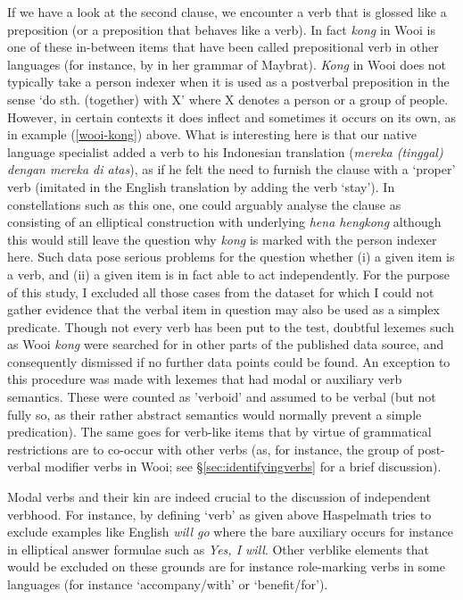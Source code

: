 If we have a look at the second clause, we encounter a verb that is glossed like a preposition (or a preposition that behaves like a verb). In fact \textit{kong} in Wooi is one of these in-between items that have been called prepositional verb in other languages (for instance, by \citet{dol2007grammar} in her grammar of Maybrat). \textit{Kong} in Wooi does not typically take a person indexer when it is used as a postverbal preposition in the sense `do sth. (together) with X' where X denotes a person or a group of people. However, in certain contexts it does inflect and sometimes it occurs on its own, as in example (\ref{wooi-kong}) above. What is interesting here is that our native language specialist added a verb to his Indonesian translation (\textit{mereka (tinggal) dengan mereka di atas}), as if he felt the need to furnish the clause with a `proper' verb (imitated in the English translation by adding the verb `stay'). In constellations such as this one, one could arguably analyse the clause as consisting of an elliptical construction with underlying \textit{hena hengkong} although this would still leave the question why \textit{kong} is marked with the person indexer here. Such data pose serious problems for the question whether (i) a given item is a verb, and (ii) a given item is in fact able to act independently. For the purpose of this study, I excluded all those cases from the dataset for which I could not gather evidence that the verbal item in question may also be used as a simplex predicate. Though not every verb has been put to the test, doubtful lexemes such as Wooi \textit{kong} were searched for in other parts of the published data source, and consequently dismissed if no further data points could be found. An exception to this procedure was made with lexemes that had modal or auxiliary verb semantics. These were counted as 'verboid' and assumed to be verbal (but not fully so, as their rather abstract semantics would normally prevent a simple predication). The same goes for verb-like items that by virtue of grammatical restrictions are to co-occur with other verbs (as, for instance, the group of post-verbal modifier verbs in Wooi; see §\ref{sec:identifyingverbs} for a brief discussion).

Modal verbs and their kin are indeed crucial to the discussion of independent verbhood. For instance, by defining `verb' as given above Haspelmath tries to exclude examples like English \textit{will go} where the bare auxiliary occurs for instance in elliptical answer formulae such as \textit{Yes, I will}. Other verblike elements that would be excluded on these grounds are for instance role-marking verbs in some languages (for instance `accompany/with' or `benefit/for'). 

